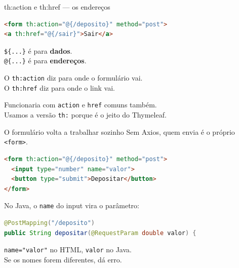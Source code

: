 \documentclass[aspectratio=169,11pt]{beamer}
\begin{document}
\begin{frame}[fragile]{th:action e th:href --- os endereços}
\begin{lstlisting}[language=HTML,basicstyle=\ttfamily\footnotesize]
<form th:action="@{/deposito}" method="post">
<a th:href="@{/sair}">Sair</a>
\end{lstlisting}

  \vspace{0.4em}
  \texttt{\$\{...\}} é para \textbf{dados}.\\
  \texttt{@\{...\}} é para \textbf{endereços}.

  \vspace{0.5em}
  O \texttt{th:action} diz para onde o formulário vai.\\
  O \texttt{th:href} diz para onde o link vai.

  \vspace{0.5em}
  Funcionaria com \texttt{action} e \texttt{href} comuns também.\\
  Usamos a versão \texttt{th:} porque é o jeito do Thymeleaf.
\end{frame}

\begin{frame}[fragile]{O formulário volta a trabalhar sozinho}
  Sem Axios, quem envia é o próprio \texttt{<form>}.

\begin{lstlisting}[language=HTML,basicstyle=\ttfamily\footnotesize]
<form th:action="@{/deposito}" method="post">
  <input type="number" name="valor">
  <button type="submit">Depositar</button>
</form>
\end{lstlisting}

  No Java, o \texttt{name} do input vira o parâmetro:

\begin{lstlisting}[language=Java,basicstyle=\ttfamily\footnotesize]
@PostMapping("/deposito")
public String depositar(@RequestParam double valor) {
\end{lstlisting}

  \texttt{name="valor"} no HTML, \texttt{valor} no Java.\\
  Se os nomes forem diferentes, dá erro.
\end{frame}
\end{document}
